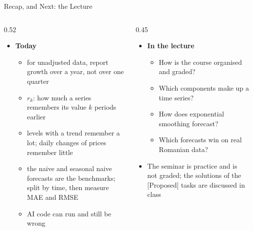 \begin{frame}{Recap, and Next: the  Lecture}
\itemsize{\footnotesize}
\begin{columns}[T]
\begin{column}{0.52\textwidth}
\begin{itemize}
    \item \textbf{Today}
    \begin{itemize}
        \item for unadjusted data, report growth over a year, not over one quarter
        \item $r_k$: how much a series remembers its value $k$ periods earlier
        \item levels with a trend remember a lot; daily changes of prices remember little
        \item the naive and seasonal naive forecasts are the benchmarks; split by time, then measure MAE and RMSE
        \item AI code can run and still be wrong
    \end{itemize}
\end{itemize}
\end{column}
\begin{column}{0.45\textwidth}
\begin{itemize}
    \item \textbf{In the lecture}
    \begin{itemize}
        \item How is the course organised and graded?
        \item Which components make up a time series?
        \item How does exponential smoothing forecast?
        \item Which forecasts win on real Romanian data?
    \end{itemize}
    \item The seminar is practice and is not graded; the solutions of the [Proposed] tasks are discussed in class
\end{itemize}
\end{column}
\end{columns}
\end{frame}


